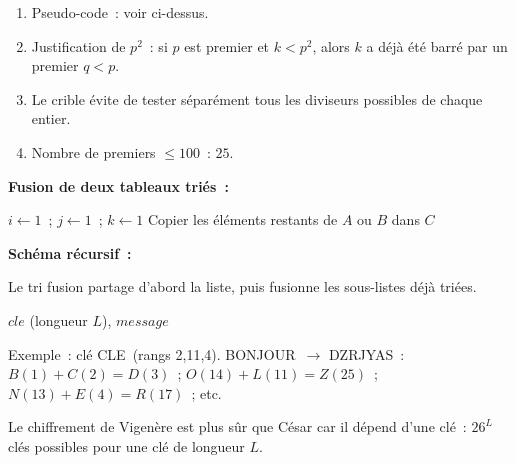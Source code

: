 \begin{enumerate}
  \item Pseudo-code~: voir ci-dessus.
  \item Justification de $p^2$~: si $p$ est premier et $k<p^2$, alors
        $k$ a d\'ej\`a \'et\'e barr\'e par un premier $q<p$.
  \item Le crible évite de tester séparément tous les diviseurs possibles de
        chaque entier.
  \item Nombre de premiers $\leq 100$~: $25$.
\end{enumerate}


\textbf{Fusion de deux tableaux tri\'es~:}
\begin{algorithm}[H]
\caption{Fusion}
$i\leftarrow1$~; $j\leftarrow1$~; $k\leftarrow1$\;
Copier les \'el\'ements restants de $A$ ou $B$ dans $C$\;
\end{algorithm}

\textbf{Sch\'ema r\'ecursif~:}
\begin{algorithm}[H]
\caption{Tri fusion (sch\'ema)}
\end{algorithm}

Le tri fusion partage d'abord la liste, puis fusionne les sous-listes déjà triées.


\begin{algorithm}[H]
\caption{Chiffrement de Vigen\`ere}
\Lire $\mathit{cle}$ (longueur $L$), $\mathit{message}$\;
\end{algorithm}

Exemple~: cl\'e \og CLE\fg\ (rangs 2,11,4).
\og BONJOUR\fg\ $\to$ \og DZRJYAS\fg~:
$B(1)+C(2)=D(3)$~; $O(14)+L(11)=Z(25)$~; $N(13)+E(4)=R(17)$~; etc.

Le chiffrement de Vigen\`ere est plus s\^ur que C\'esar car il d\'epend d'une cl\'e~:
$26^L$ cl\'es possibles pour une cl\'e de longueur $L$.

